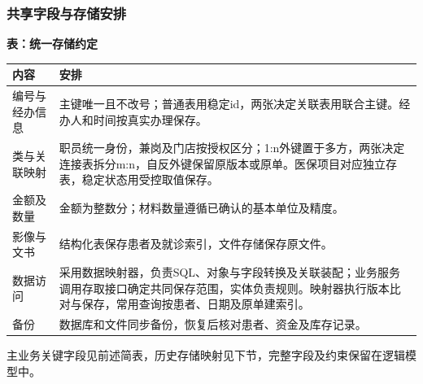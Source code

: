 \documentclass[UTF8,a4paper,zihao=-4,fontset=none]{ctexart}
\begin{document}
\subsubsection{共享字段与存储安排}
{\small\setlength{\tabcolsep}{3pt}\renewcommand{\arraystretch}{1.02}
\noindent\textbf{表\thetable：统一存储约定}\par\smallskip
\noindent\begin{tabular}{@{}>{\raggedright\arraybackslash}p{2.944cm}>{\raggedright\arraybackslash}p{12.756cm}@{}}
\toprule
内容 & 安排 \\ \midrule
编号与经办信息 & 主键唯一且不改号；普通表用稳定id，两张决定关联表用联合主键。经办人和时间按真实办理保存。 \\
类与关联映射 & 职员统一身份，兼岗及门店按授权区分；1:n外键置于多方，两张决定连接表拆分m:n，自反外键保留原版本或原单。医保项目对应独立存表，稳定状态用受控取值保存。 \\
金额及数量 & 金额为整数分；材料数量遵循已确认的基本单位及精度。 \\
影像与文书 & 结构化表保存患者及就诊索引，文件存储保存原文件。 \\
数据访问 & 采用数据映射器，负责SQL、对象与字段转换及关联装配；业务服务调用存取接口确定共同保存范围，实体负责规则。映射器执行版本比对与保存，常用查询按患者、日期及原单建索引。 \\
备份 & 数据库和文件同步备份，恢复后核对患者、资金及库存记录。 \\
\bottomrule
\end{tabular}\par}
\medskip
主业务关键字段见前述简表，历史存储映射见下节，完整字段及约束保留在逻辑模型中。\par

\clearpage
\end{document}
